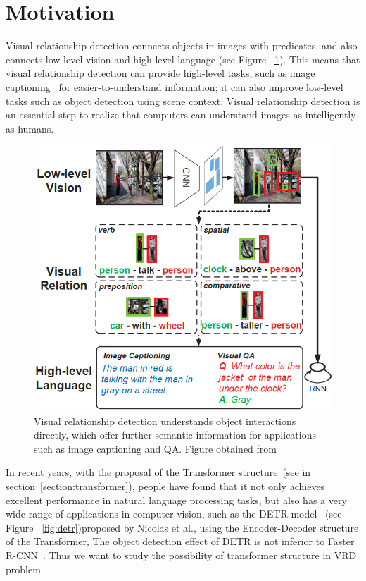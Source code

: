 \section{Motivation}

Visual relationship detection connects objects in images with predicates, and also connects low-level vision and high-level language (see Figure ~\ref{fig:vrd}). This means that visual relationship detection can provide high-level tasks, such as image captioning~\cite{hossain2019comprehensive} for easier-to-understand information; it can also improve low-level tasks such as object detection using scene context. Visual relationship detection is an essential step to realize that computers can understand images as intelligently as humans.

\begin{figure}[!htbp]
	\centering
	\includegraphics[width = 0.7 \textwidth]{figures/VRD.png}
	\caption[Connection between low-level vision and high-level vision]
	{ Visual relationship detection understands object interactions directly, which offer further semantic information for applications such as image captioning and QA. Figure obtained from ~\cite{zhang2017visual}}
	\label{fig:vrd}
\end{figure}

In recent years, with the proposal of the Transformer structure~\cite{vaswani2017attention}(see in section~\ref{section:transformer}), people have found that it not only achieves excellent performance in natural language processing tasks, but also has a very wide range of applications in computer vision, such as the DETR model~\cite{carion2020end} (see Figure ~\ref{fig:detr})proposed by Nicolas et al., using the Encoder-Decoder structure of the Transformer, The object detection effect of DETR is not inferior to Faster R-CNN~\cite{ren2016faster}. Thus we want to study the possibility of transformer structure in VRD problem.


